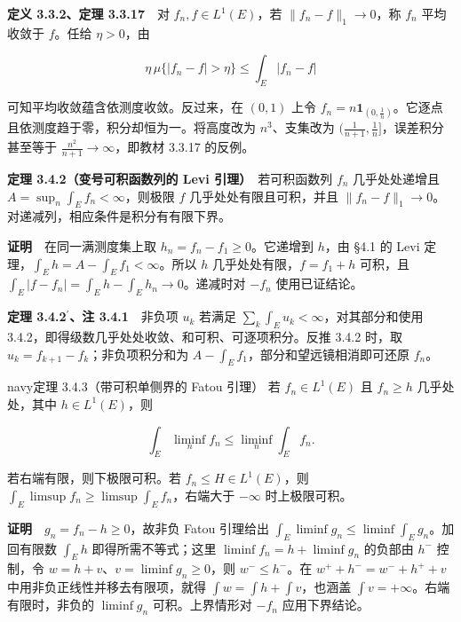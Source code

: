 \documentclass[11pt,a4paper]{article}
\begin{document}
\textbf{定义 3.3.2、定理 3.3.17}　对 \(f_n,f\in L^1(E)\)，若
\(\|f_n-f\|_1\to0\)，称 \(f_n\) 平均收敛于 \(f\)。任给 \(\eta>0\)，由

\begin{equation*}
\eta\,\mu\{|f_n-f|>\eta\}\le\int_E|f_n-f|
\end{equation*}

可知平均收敛蕴含依测度收敛。反过来，在 \((0,1)\) 上令
\(f_n=n\mathbf1_{(0,\frac{1}{n})}\)。它逐点且依测度趋于零，积分却恒为一。将高度改为
\(n^3\)、支集改为 \((\frac{1}{n+1},\frac{1}{n}]\)，误差积分甚至等于
\(\frac{n^2}{n+1}\to\infty\)，即教材 3.3.17 的反例。

\textbf{定理 3.4.2（变号可积函数列的 Levi 引理）}　若可积函数列 \(f_n\)
几乎处处递增且 \(A=\sup_n\int_E f_n<\infty\)，则极限 \(f\)
几乎处处有限且可积，并且
\(\|f_n-f\|_1\to0\)。对递减列，相应条件是积分有有限下界。

\textbf{证明}　在同一满测度集上取 \(h_n=f_n-f_1\ge0\)。它递增到
\(h\)，由 §4.1 的 Levi 定理，\(\int_E h=A-\int_E f_1<\infty\)。所以
\(h\) 几乎处处有限，\(f=f_1+h\) 可积，且
\(\int_E|f-f_n|=\int_E h-\int_E h_n\to0\)。递减时对 \(-f_n\)
使用已证结论。

\textbf{定理 3.4.2\ensuremath{{}^{\prime}}、注 3.4.1}　非负项 \(u_k\) 若满足
\(\sum_k\int_Eu_k<\infty\)，对其部分和使用
3.4.2，即得级数几乎处处收敛、和可积、可逐项积分。反推 3.4.2 时，取
\(u_k=f_{k+1}-f_k\)；非负项积分和为
\(A-\int_E f_1\)，部分和望远镜相消即可还原 \(f_n\)。

\begin{sboxenv}{navy}{定理 3.4.3（带可积单侧界的 Fatou 引理）}
若 \(f_n\in L^1(E)\) 且 \(f_n\ge h\) 几乎处处，其中 \(h\in L^1(E)\)，则

\begin{equation*}
\int_E\liminf_n f_n\le\liminf_n\int_E f_n .
\end{equation*}

若右端有限，则下极限可积。若 \(f_n\le H\in L^1(E)\)，则
\(\int_E\limsup f_n\ge\limsup\int_E f_n\)，右端大于 \(-\infty\)
时上极限可积。

\end{sboxenv}

\textbf{证明}　\(g_n=f_n-h\ge0\)，故非负 Fatou 引理给出
\(\int_E\liminf g_n\le\liminf\int_E g_n\)。加回有限数 \(\int_E h\)
即得所需不等式；这里 \(\liminf f_n=h+\liminf g_n\) 的负部由 \(h^-\)
控制，令 \(w=h+v\)、\(v=\liminf g_n\ge0\)，则 \(w^-\le h^-\)。在
\(w^++h^-=w^-+h^++v\) 中用非负正线性并移去有限项，就得
\(\int w=\int h+\int v\)，也涵盖 \(\int v=+\infty\)。右端有限时，非负的
\(\liminf g_n\) 可积。上界情形对 \(-f_n\) 应用下界结论。
\end{document}
